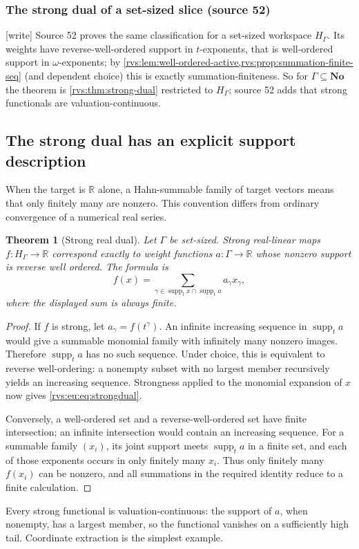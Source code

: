 \documentclass[11pt,letterpaper]{article}
\numberwithin{equation}{section}
\newtheorem{theorem}{Theorem}[section]
\theoremstyle{definition}
\theoremstyle{remark}
\newcommand{\No}{\mathbf{No}}
\newcommand{\R}{\mathbb{R}}
\newcommand{\supp}{\operatorname{supp}}
\newcommand{\wtag}{\textup{[write]}}%
\begin{document}
\subsubsection*{The strong dual of a set-sized slice (source 52)}

\noindent\wtag{} Source 52 proves the same classification for a set-sized
workspace \(H_\Gamma\).  Its weights have reverse-well-ordered support in
\(t\)-exponents, that is well-ordered support in \(\omega\)-exponents; by
\cref{rvs:lem:well-ordered-active,rvs:prop:summation-finite-seq} (and
dependent choice) this is exactly summation-finiteness.  So for
\(\Gamma\subseteq\No\) the theorem is \cref{rvs:thm:strong-dual} restricted
to \(H_\Gamma\); source 52 adds that strong functionals are
valuation-continuous.

\subsection{The strong dual has an explicit support description}
When the target is $\R$ alone, a Hahn-summable family of target vectors means that only finitely many are nonzero. This convention differs from ordinary convergence of a numerical real series.

\begin{theorem}[Strong real dual]\label{rvs:eu:thm:strongdual}
Let $\Gamma$ be set-sized. Strong real-linear maps $f:H_\Gamma\to\R$ correspond exactly to weight functions $a:\Gamma\to\R$ whose nonzero support is reverse well ordered. The formula is
\begin{equation}\label{rvs:eu:eq:strongdual}
 f(x)=\sum_{\gamma\in\supp_t x\cap\supp_t a}a_\gamma x_\gamma,
\end{equation}
where the displayed sum is always finite.
\end{theorem}
\begin{proof}
If $f$ is strong, let $a_\gamma=f(t^\gamma)$. An infinite increasing sequence in $\supp_t a$ would give a summable monomial family with infinitely many nonzero images. Therefore $\supp_t a$ has no such sequence. Under choice, this is equivalent to reverse well-ordering: a nonempty subset with no largest member recursively yields an increasing sequence. Strongness applied to the monomial expansion of $x$ now gives \eqref{rvs:eu:eq:strongdual}.

Conversely, a well-ordered set and a reverse-well-ordered set have finite intersection; an infinite intersection would contain an increasing sequence. For a summable family $(x_i)$, its joint support meets $\supp_t a$ in a finite set, and each of those exponents occurs in only finitely many $x_i$. Thus only finitely many $f(x_i)$ can be nonzero, and all summations in the required identity reduce to a finite calculation.
\end{proof}
Every strong functional is valuation-continuous: the support of $a$, when nonempty, has a largest member, so the functional vanishes on a sufficiently high tail. Coordinate extraction is the simplest example.
\end{document}
